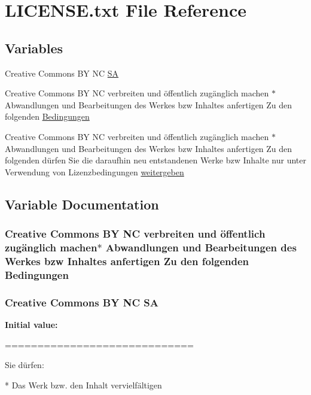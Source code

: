 \hypertarget{LICENSE_8txt}{}\section{L\+I\+C\+E\+N\+S\+E.\+txt File Reference}
\label{LICENSE_8txt}
\subsection*{Variables}
\begin{DoxyCompactItemize}
\item 
Creative Commons BY NC \hyperlink{LICENSE_8txt_acd2677bfcad4a9ead2876642949ff187}{SA}
\item 
Creative Commons BY NC verbreiten und öffentlich zugänglich machen $\ast$Abwandlungen und Bearbeitungen des Werkes bzw Inhaltes anfertigen Zu den folgenden \hyperlink{LICENSE_8txt_aac71bfa56376e5e6246ef9e5cd07898f}{Bedingungen}
\item 
Creative Commons BY NC verbreiten und öffentlich zugänglich machen $\ast$Abwandlungen und Bearbeitungen des Werkes bzw Inhaltes anfertigen Zu den folgenden dürfen Sie die daraufhin neu entstandenen Werke bzw Inhalte nur unter Verwendung von Lizenzbedingungen \hyperlink{LICENSE_8txt_a7950c2dd46b3c19b23fc5c2a2bd9d8fa}{weitergeben}
\end{DoxyCompactItemize}


\subsection{Variable Documentation}
\subsubsection[{\texorpdfstring{Bedingungen}{Bedingungen}}]{\setlength{\rightskip}{0pt plus 5cm}Creative Commons BY NC verbreiten und öffentlich zugänglich machen$\ast$ Abwandlungen und Bearbeitungen des Werkes bzw Inhaltes anfertigen Zu den folgenden Bedingungen}\hypertarget{LICENSE_8txt_aac71bfa56376e5e6246ef9e5cd07898f}{}\label{LICENSE_8txt_aac71bfa56376e5e6246ef9e5cd07898f}
\subsubsection[{\texorpdfstring{SA}{SA}}]{\setlength{\rightskip}{0pt plus 5cm}Creative Commons BY NC SA}\hypertarget{LICENSE_8txt_acd2677bfcad4a9ead2876642949ff187}{}\label{LICENSE_8txt_acd2677bfcad4a9ead2876642949ff187}
{\bfseries Initial value\+:}
\begin{DoxyCode}
=============================

Sie dürfen:

* Das Werk bzw. den Inhalt vervielfältigen
\end{DoxyCode}
